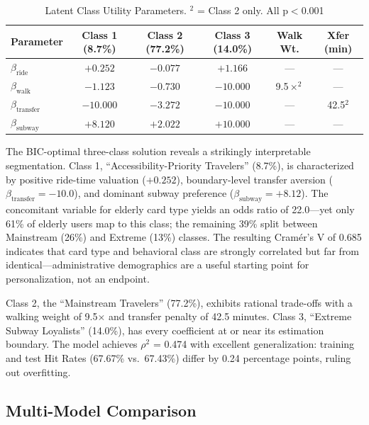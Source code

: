 \begin{table}[htbp]
\centering
\tablefont
\begin{tabular}{|l|c|c|c|c|c|}
\hline
\headrow
\textbf{Parameter} & \textbf{Class 1 (8.7\%)} & \textbf{Class 2 (77.2\%)} &
\textbf{Class 3 (14.0\%)} & \textbf{Walk Wt.} & \textbf{Xfer (min)} \\
\hline
$\beta_{\mathrm{ride}}$     & $+0.252$  & $-0.077$ & $+1.166$  & ---              & ---    \\
\hline
$\beta_{\mathrm{walk}}$     & $-1.123$  & $-0.730$ & $-10.000$ & 9.5$\times^{2}$  & ---    \\
\hline
$\beta_{\mathrm{transfer}}$ & $-10.000$ & $-3.272$ & $-10.000$ & ---              & 42.5$^{2}$ \\
\hline
$\beta_{\mathrm{subway}}$   & $+8.120$  & $+2.022$ & $+10.000$ & ---              & ---    \\
\hline
\end{tabular}
\caption{Latent Class Utility Parameters. $^{2}$ = Class 2 only. All p$<$0.001}
\end{table}

The BIC-optimal three-class solution reveals a strikingly interpretable
segmentation. Class 1, ``Accessibility-Priority Travelers'' (8.7\%), is
characterized by positive ride-time valuation ($+0.252$), boundary-level
transfer aversion ($\beta_{\mathrm{transfer}} = -10.0$), and dominant subway
preference ($\beta_{\mathrm{subway}} = +8.12$). The concomitant variable for
elderly card type yields an odds ratio of 22.0---yet only 61\% of elderly
users map to this class; the remaining 39\% split between Mainstream (26\%)
and Extreme (13\%) classes. The resulting Cram\'er's V of 0.685 indicates that
card type and behavioral class are strongly correlated but far from
identical---administrative demographics are a useful starting point for
personalization, not an endpoint.

Class 2, the ``Mainstream Travelers'' (77.2\%), exhibits rational trade-offs
with a walking weight of 9.5$\times$ and transfer penalty of 42.5 minutes.
Class 3, ``Extreme Subway Loyalists'' (14.0\%), has every coefficient at or
near its estimation boundary. The model achieves $\rho^2$ = 0.474 with
excellent generalization: training and test Hit Rates (67.67\% vs.\ 67.43\%)
differ by 0.24 percentage points, ruling out overfitting.

\subsection{Multi-Model Comparison}


